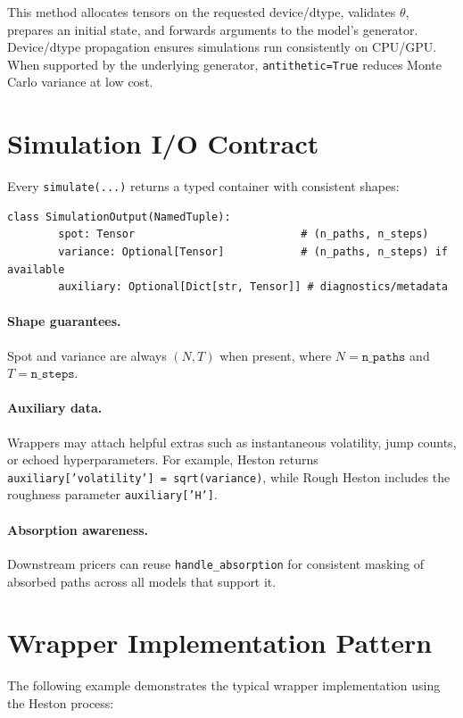 	This method allocates tensors on the requested device/dtype, validates \(\theta\), prepares an initial state, and forwards arguments to the model's generator. Device/dtype propagation ensures simulations run consistently on CPU/GPU. When supported by the underlying generator, \texttt{antithetic=True} reduces Monte Carlo variance at low cost.
	
	\section{Simulation I/O Contract}
	
	Every \texttt{simulate(...)} returns a typed container with consistent shapes:
	\begin{lstlisting}[style=cleanpy]
		class SimulationOutput(NamedTuple):
		spot: Tensor                          # (n_paths, n_steps)
		variance: Optional[Tensor]            # (n_paths, n_steps) if available
		auxiliary: Optional[Dict[str, Tensor]] # diagnostics/metadata
	\end{lstlisting}
	
	\paragraph{Shape guarantees.} Spot and variance are always \((N, T)\) when present, where \(N = \texttt{n\_paths}\) and \(T = \texttt{n\_steps}\).
	
	\paragraph{Auxiliary data.} Wrappers may attach helpful extras such as instantaneous volatility, jump counts, or echoed hyperparameters. For example, Heston returns \texttt{auxiliary['volatility'] = sqrt(variance)}, while Rough Heston includes the roughness parameter \texttt{auxiliary['H']}.
	
	\paragraph{Absorption awareness.} Downstream pricers can reuse \texttt{handle\_absorption} for consistent masking of absorbed paths across all models that support it.
	
	\section{Wrapper Implementation Pattern}
	
	The following example demonstrates the typical wrapper implementation using the Heston process:
	
